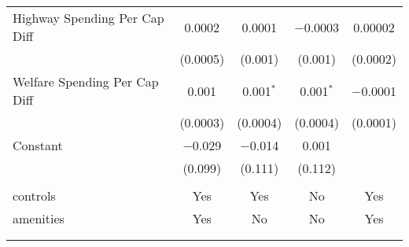 \begin{table}[!htbp]
\begin{tabular}{@{\extracolsep{5pt}}lcccc}
  Highway Spending Per Cap Diff & 0.0002 & 0.0001 & $-$0.0003 & 0.00002 \\ 
  & (0.0005) & (0.001) & (0.001) & (0.0002) \\ 
  Welfare Spending Per Cap Diff & 0.001 & 0.001$^{*}$ & 0.001$^{*}$ & $-$0.0001 \\ 
  & (0.0003) & (0.0004) & (0.0004) & (0.0001) \\ 
  Constant & $-$0.029 & $-$0.014 & 0.001 &  \\ 
  & (0.099) & (0.111) & (0.112) &  \\ 
 \hline \\[-1.8ex] 
controls & Yes & Yes & No & Yes \\ 
amenities & Yes & No & No & Yes \\ 
\hline \\[-1.8ex] 
\hline 
\hline \\[-1.8ex] 
\end{tabular} 
\end{table} 
